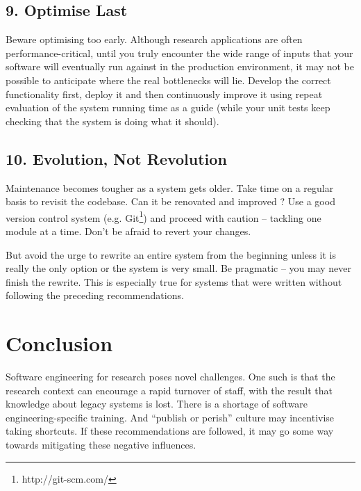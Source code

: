 \documentclass{bmcart}
\begin{document}
\subsection*{9. Optimise Last}

Beware optimising too early. Although research applications are often performance-critical, until you truly encounter the wide range of inputs that your software will eventually run against in the production environment, it may not be possible to anticipate where the real bottlenecks will lie. Develop the correct functionality first, deploy it and then continuously improve it using repeat evaluation of the system running time as a guide (while your unit tests keep checking that the system is doing what it should). 

\subsection*{10. Evolution, Not Revolution}

Maintenance becomes tougher as a system gets older. Take time on a regular basis to revisit the codebase. Can it be renovated and improved \cite{refactoring}? Use a good version control system (e.g. Git\footnote{http://git-scm.com/}) and proceed with caution -- tackling one module at a time. Don't be afraid to revert your changes. 

But avoid the urge to rewrite an entire system from the beginning unless it is really the only option or the system is very small. Be pragmatic \cite{pragprog} -- you may never finish the rewrite. This is especially true for systems that were written without following the preceding recommendations. 

\section*{Conclusion}

Software engineering for research poses novel challenges. One such is that the research context can encourage a rapid turnover of staff, with the result that knowledge about legacy systems is lost. There is a shortage of software engineering-specific training. And ``publish or perish'' culture may incentivise taking shortcuts. If these recommendations are followed, it may go some way towards mitigating these negative influences. 


\end{document}
